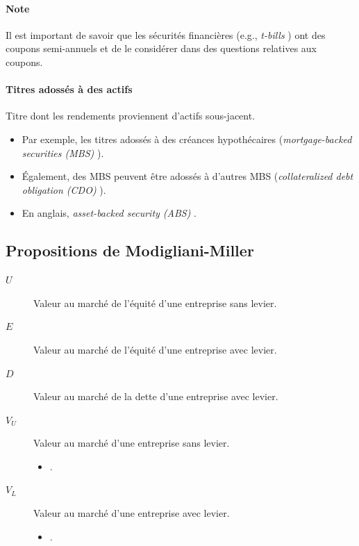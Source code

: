 \documentclass[10pt, french]{article}
\begin{document}
\begin{multicols*}{2}
\paragraph{Note}	Il est important de savoir que les sécurités financières (e.g., \og \textit{t-bills} \fg{}) ont des coupons semi-annuels et de le considérer dans des questions relatives aux coupons.


\paragraph{Titres adossés à des actifs}
\begin{definitionNOHFILL}
Titre dont les rendements proviennent d'actifs sous-jacent.

\begin{itemize}
	\item	Par exemple, les titres adossés à des créances hypothécaires (\og \textit{mortgage-backed securities (MBS)} \fg{}).
	\item	Également, des MBS peuvent être adossés à d'autres MBS (\og \textit{collateralized debt obligation (CDO)} \fg{}).
	\item	En anglais, \og \textit{asset-backed security (ABS)} \fg{}.
\end{itemize}
\end{definitionNOHFILL}


\columnbreak
\subsection{Propositions de Modigliani-Miller}
\begin{distributions}[Notation]
\begin{description}
	\item[$U$]	Valeur au marché de l'équité d'une entreprise sans levier.
	\item[$E$]	Valeur au marché de l'équité d'une entreprise avec levier.
	\item[$D$]	Valeur au marché de la dette d'une entreprise avec levier.
	\item[$V_{U}$]	Valeur au marché d'une entreprise sans levier.
		\begin{itemize}
		\item	{}.
		\end{itemize}
	\item[$V_{L}$]	Valeur au marché d'une entreprise avec levier.
		\begin{itemize}
		\item	{}.
		\end{itemize}
\end{description}
\end{distributions}


\end{multicols*}
\end{document}
